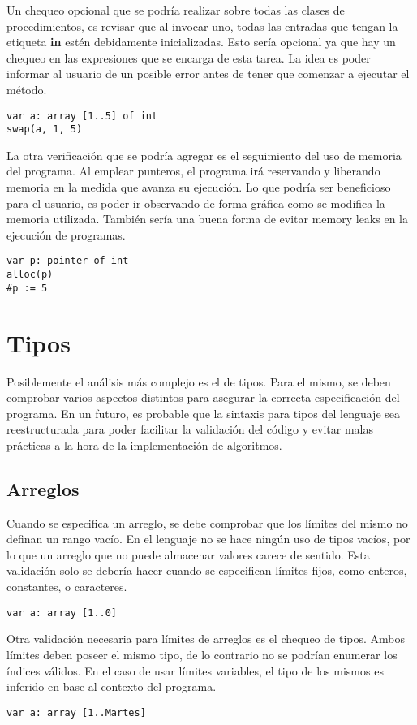 \documentclass{article}
\begin{document}
Un chequeo opcional que se podría realizar sobre todas las clases de procedimientos, es revisar que al invocar uno, todas las entradas que tengan la etiqueta \textbf{in} estén debidamente inicializadas.
Esto sería opcional ya que hay un chequeo en las expresiones que se encarga de esta tarea.
La idea es poder informar al usuario de un posible error antes de tener que comenzar a ejecutar el método.
\begin{lstlisting}
var a: array [1..5] of int
swap(a, 1, 5)
\end{lstlisting}

La otra verificación que se podría agregar es el seguimiento del uso de memoria del programa.
Al emplear punteros, el programa irá reservando y liberando memoria en la medida que avanza su ejecución.
Lo que podría ser beneficioso para el usuario, es poder ir observando de forma gráfica como se modifica la memoria utilizada.
También sería una buena forma de evitar memory leaks en la ejecución de programas.
\begin{lstlisting}
var p: pointer of int
alloc(p)
#p := 5
\end{lstlisting}

\section{Tipos}

Posiblemente el análisis más complejo es el de tipos.
Para el mismo, se deben comprobar varios aspectos distintos para asegurar la correcta especificación del programa.
En un futuro, es probable que la sintaxis para tipos del lenguaje sea reestructurada para poder facilitar la validación del código y evitar malas prácticas a la hora de la implementación de algoritmos.

\subsection{Arreglos}

Cuando se especifica un arreglo, se debe comprobar que los límites del mismo no definan un rango vacío.
En el lenguaje no se hace ningún uso de tipos vacíos, por lo que un arreglo que no puede almacenar valores carece de sentido.
Esta validación solo se debería hacer cuando se especifican límites fijos, como enteros, constantes, o caracteres.
\begin{lstlisting}
var a: array [1..0]
\end{lstlisting}

Otra validación necesaria para límites de arreglos es el chequeo de tipos.
Ambos límites deben poseer el mismo tipo, de lo contrario no se podrían enumerar los índices válidos.
En el caso de usar límites variables, el tipo de los mismos es inferido en base al contexto del programa.
\begin{lstlisting}
var a: array [1..Martes]
\end{lstlisting}
\end{document}
